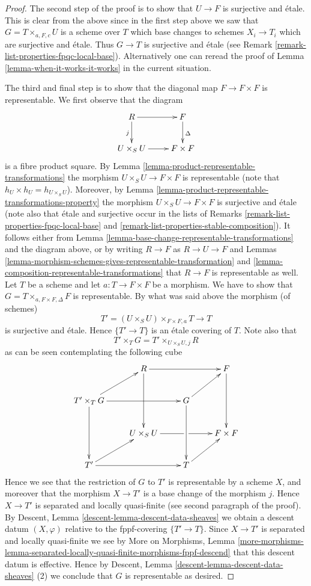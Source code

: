 \documentclass{stacks-project}
\theoremstyle{plain}
\theoremstyle{definition}
\theoremstyle{remark}
\numberwithin{equation}{subsection}
\begin{document}
\begin{proof}
\medskip\noindent
The second step of the proof is to show that $U \to F$ is surjective and
\'etale. This is clear from the above since in the first step above we
saw that $G = T \times_{a, F, c} U$ is a scheme over $T$ which base changes
to schemes $X_i \to T_i$ which are surjective and \'etale. Thus $G \to T$
is surjective and \'etale (see
Remark \ref{remark-list-properties-fpqc-local-base}).
Alternatively one can reread the proof of
Lemma \ref{lemma-when-it-works-it-works} in the current
situation.

\medskip\noindent
The third and final step is to show that the diagonal map $F \to F \times F$
is representable. We first observe that the diagram
$$
\xymatrix{
R \ar[r] \ar[d]_j & F \ar[d]^\Delta \\
U \times_S U \ar[r] & F \times F
}
$$
is a fibre product square. By
Lemma \ref{lemma-product-representable-transformations} the morphism
$U \times_S U \to F \times F$ is representable (note that
$h_U \times h_U = h_{U \times_S U}$). Moreover, by
Lemma \ref{lemma-product-representable-transformations-property}
the morphism $U \times_S U \to F \times F$ is surjective
and \'etale (note also that \'etale and surjective occur in the lists of
Remarks \ref{remark-list-properties-fpqc-local-base}
and \ref{remark-list-properties-stable-composition}).
It follows either from
Lemma \ref{lemma-base-change-representable-transformations}
and the diagram above, or by writing $R \to F$ as $R \to U \to F$ and
Lemmas
\ref{lemma-morphism-schemes-gives-representable-transformation} and
\ref{lemma-composition-representable-transformations} that
$R \to F$ is representable as well. Let $T$ be a scheme and let
$a : T \to F \times F$ be a morphism. We have to show that
$G = T \times_{a, F \times F, \Delta} F$ is representable.
By what was said above the morphism (of schemes)
$$
T' = (U \times_S U) \times_{F \times F, a} T \longrightarrow T
$$
is surjective and \'etale. Hence $\{T' \to T\}$ is an \'etale
covering of $T$. Note also that
$$
T' \times_T G = T' \times_{U \times_S U, j} R
$$
as can be seen contemplating the following cube
$$
\xymatrix{
& R \ar[rr] \ar[dd] & & F \ar[dd] \\
T' \times_T G \ar[rr] \ar[dd] \ar[ru] & & G \ar[dd] \ar[ru] & \\
& U \times_S U \ar'[r][rr] & & F \times F \\
T' \ar[rr] \ar[ru] & & T \ar[ru]
}
$$
Hence we see that the restriction of $G$ to $T'$ is representable
by a scheme $X$, and moreover that the morphism $X \to T'$ is
a base change of the morphism $j$. Hence $X \to T'$ is
separated and locally quasi-finite (see second paragraph of the proof).
By Descent, Lemma \ref{descent-lemma-descent-data-sheaves}
we obtain a descent datum $(X, \varphi)$ relative
to the fppf-covering $\{T' \to T\}$. Since
$X \to T'$ is separated and locally quasi-finite we see by
More on Morphisms, Lemma
\ref{more-morphisms-lemma-separated-locally-quasi-finite-morphisms-fppf-descend}
that this descent datum is effective.
Hence by
Descent, Lemma \ref{descent-lemma-descent-data-sheaves} (2)
we conclude that $G$ is representable as desired.
\end{proof}
\end{document}
